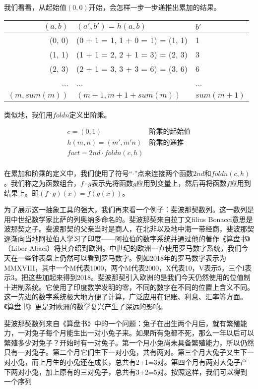 \documentclass[UTF8]{article}
\begin{document}
我们看看，从起始值$(0, 0)$开始，会怎样一步一步递推出累加的结果。

\vspace{5mm}
\begin{tabular}{r|l|l}
$(a, b)$ & $(a', b') = h (a, b)$ & $b'$\\
\hline
(0, 0) & (0 + 1 = 1, 1 + 0 = 1) = (1, 1) & 1 \\
(1, 1) & (1 + 1 = 2, 2 + 1 = 3) = (2, 3) & 3 \\
(2, 3) & (2 + 1 = 3, 3 + 3 = 6) = (3, 6) & 6 \\
... & ... & ... \\
$(m, sum(m))$ & $(m + 1, m + 1 + sum(m))$ & $sum(m + 1)$
\end{tabular}
\vspace{5mm}

类似地，我们用$foldn$定义出阶乘。

\[
\begin{array}{lr}
c = (0, 1) & \text{阶乘的起始值} \\
h (m, n) = (m', m'n) & \text{阶乘的递推} \\
fact = 2nd \cdot foldn(c, h) \\
\end{array}
\]

在累加和阶乘的定义中，我们使用了符号“$\cdot$”点来连接两个函数$2nd$和$foldn(c, h)$。我们称之为函数组合，$f\cdot g$表示先将函数$g$应用到变量上，然后再将函数$f$应用到结果上。即$(f\cdot g)(x) = f(g(x))$。

为了展示这一抽象工具的强大，我们再来看一个例子：斐波那契数列。这一数列是用中世纪数学家比萨的列奥纳多命名的。斐波那契来自拉丁文filius Bonacci意思是波那契之子。斐波那契的父亲当时是商人，在北非以及地中海一带经商，斐波那契逐渐向当地阿拉伯人学习了印度——阿拉伯的数字系统并通过他的著作《算盘书》（Liber Abaci）将其介绍到欧洲。中世纪的欧洲一直使用罗马数字系统，我们今天在一些钟表盘上仍然可以看到罗马数字。例如2018年的罗马数字表示为MMXVIII，其中一个M代表1000，两个M代表2000，X代表10，V表示5，三个I表示3。把这些加起来得到2018。斐波那契引入欧洲的是我们今天仍然使用的位值制十进制系统。它使用了印度数学发明的零，不同的数字在不同的位置上含义不同。这一先进的数字系统极大地方便了计算，广泛应用在记账、利息、汇率等方面。《算盘书》更是对欧洲的数学复兴产生了深远的影响。

斐波那契数列来自《算盘书》中的一个问题：兔子在出生两个月后，就有繁殖能力，一对兔子每个月能生出一对小兔子来。如果所有兔都不死，那么一年以后可以繁殖多少对兔子？开始时有一对兔子。第一个月小兔尚未具备繁殖能力，所以仍然只有一对兔子。第二个月它们生下一对小兔，共有两对。第三个月大兔子又生下一对小兔，而上月生的小兔还在成长，总共有2+1=3对。第四个月有两对大兔子产下两对小兔，加上原有的三对兔子，总共有3+2=5对。按照这样，我们可以得到一个序列
\end{document}
